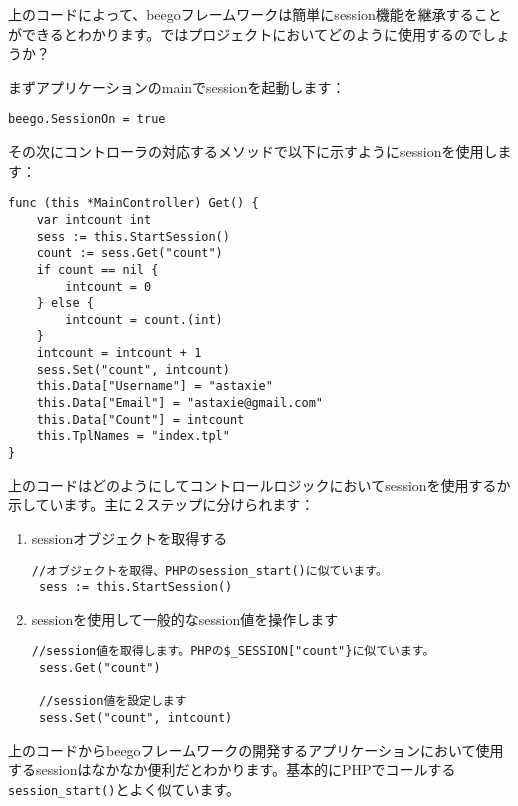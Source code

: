 上のコードによって、beegoフレームワークは簡単にsession機能を継承することができるとわかります。ではプロジェクトにおいてどのように使用するのでしょうか？

まずアプリケーションのmainでsessionを起動します：

\begin{lstlisting}[numbers=none]
beego.SessionOn = true
\end{lstlisting}

その次にコントローラの対応するメソッドで以下に示すようにsessionを使用します：



\begin{lstlisting}[numbers=none]
func (this *MainController) Get() {
    var intcount int
    sess := this.StartSession()
    count := sess.Get("count")
    if count == nil {
        intcount = 0
    } else {
        intcount = count.(int)
    }
    intcount = intcount + 1
    sess.Set("count", intcount)
    this.Data["Username"] = "astaxie"
    this.Data["Email"] = "astaxie@gmail.com"
    this.Data["Count"] = intcount
    this.TplNames = "index.tpl"
}
\end{lstlisting}

上のコードはどのようにしてコントロールロジックにおいてsessionを使用するか示しています。主に２ステップに分けられます：

\begin{enumerate}
  \item sessionオブジェクトを取得する
\begin{lstlisting}[numbers=none]
 //オブジェクトを取得、PHPのsession_start()に似ています。
 sess := this.StartSession()
\end{lstlisting}
  \item sessionを使用して一般的なsession値を操作します
\begin{lstlisting}[numbers=none]
 //session値を取得します。PHPの$_SESSION["count"}に似ています。
 sess.Get("count")

 //session値を設定します
 sess.Set("count", intcount)
\end{lstlisting}
\end{enumerate}

上のコードからbeegoフレームワークの開発するアプリケーションにおいて使用するsessionはなかなか便利だとわかります。基本的にPHPでコールする\texttt{session\_start()}とよく似ています。
